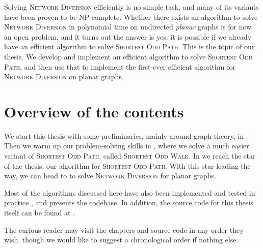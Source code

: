 Solving \textsc{Network Diversion} efficiently is no simple task, and many of its variants have been proven to be NP-complete. Whether there exists an algorithm to solve \textsc{Network Diversion} in polynomial time on undirected \emph{planar} graphs is for now an open problem, and it turns out the answer is yes: it is possible if we already have an efficient algorithm to solve \textsc{Shortest Odd Path}. This is the topic of our thesis. We develop and implement an efficient algorithm to solve \textsc{Shortest Odd Path}, and then use that to implement the first-ever efficient algorithm for \textsc{Network Diversion} on planar graphs.

\section*{Overview of the contents}
We start this thesis with some preliminaries, mainly around graph theory, in . Then we warm up our problem-solving skills in , where we solve a much easier variant of \textsc{Shortest Odd Path}, called \textsc{Shortest Odd Walk}. In  we reach the star of the thesis: our algorithm for \textsc{Shortest Odd Path}. With this star leading the way, we can head to  to solve \textsc{Network Diversion} for planar graphs. 

Most of the algorithms discussed here have also been implemented and tested in practice \cite{source:codebase}, and  presents the codebase. In addition, the source code for this thesis itself can be found at \cite{source:thesis}.

The curious reader may visit the chapters and source code in any order they wish, though we would like to suggest a chronological order if nothing else.
